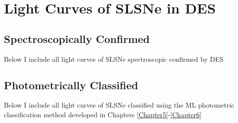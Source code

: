 \chapter{Light Curves of SLSNe in DES}
\label{AppendixA}

\section{Spectroscopically Confirmed}
Below I include all light curves of SLSNe spectroscopic confirmed by DES

\section{Photometrically Classified}
Below I include all light curves of SLSNe classified using the ML photometric classification method developed in Chapters \ref{Chapter5}-\ref{Chapter6} 

